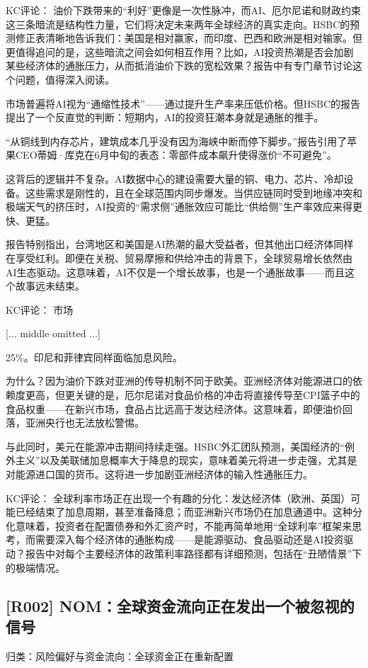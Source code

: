 \documentclass[11pt]{ctexart}
\begin{document}
KC评论： 油价下跌带来的“利好”更像是一次性脉冲，而AI、厄尔尼诺和财政约束这三条暗流是结构性力量，它们将决定未来两年全球经济的真实走向。HSBC的预测修正表清晰地告诉我们：美国是相对赢家，而印度、巴西和欧洲是相对输家。但更值得追问的是，这些暗流之间会如何相互作用？比如，AI投资热潮是否会加剧某些经济体的通胀压力，从而抵消油价下跌的宽松效果？报告中有专门章节讨论这个问题，值得深入阅读。

市场普遍将AI视为“通缩性技术”——通过提升生产率来压低价格。但HSBC的报告提出了一个反直觉的判断：短期内，AI的投资狂潮本身就是通胀的推手。

“从铜线到内存芯片，建筑成本几乎没有因为海峡中断而停下脚步。”报告引用了苹果CEO蒂姆·库克在6月中旬的表态：零部件成本飙升使得涨价“不可避免”。

这背后的逻辑并不复杂。AI数据中心的建设需要大量的铜、电力、芯片、冷却设备。这些需求是刚性的，且在全球范围内同步爆发。当供应链同时受到地缘冲突和极端天气的挤压时，AI投资的“需求侧”通胀效应可能比“供给侧”生产率效应来得更快、更猛。

报告特别指出，台湾地区和美国是AI热潮的最大受益者，但其他出口经济体同样在享受红利。即便在关税、贸易摩擦和供给冲击的背景下，全球贸易增长依然由AI生态驱动。这意味着，AI不仅是一个增长故事，也是一个通胀故事——而且这个故事远未结束。

KC评论： 市场

[... middle omitted ...]

25\%。印尼和菲律宾同样面临加息风险。

为什么？因为油价下跌对亚洲的传导机制不同于欧美。亚洲经济体对能源进口的依赖度更高，但更关键的是，厄尔尼诺对食品价格的冲击将直接传导至CPI篮子中的食品权重——在新兴市场，食品占比远高于发达经济体。这意味着，即便油价回落，亚洲央行也无法放松警惕。

与此同时，美元在能源冲击期间持续走强。HSBC外汇团队预测，美国经济的“例外主义”以及美联储加息概率大于降息的现实，意味着美元将进一步走强，尤其是对能源进口国的货币。这将进一步加剧亚洲经济体的输入性通胀压力。

KC评论： 全球利率市场正在出现一个有趣的分化：发达经济体（欧洲、英国）可能已经结束了加息周期，甚至准备降息；而亚洲新兴市场仍在加息通道中。这种分化意味着，投资者在配置债券和外汇资产时，不能再简单地用“全球利率”框架来思考，而需要深入每个经济体的通胀构成——是能源驱动、食品驱动还是AI投资驱动？报告中对每个主要经济体的政策利率路径都有详细预测，包括在“丑陋情景”下的极端情况。

\subsection{[R002] NOM：全球资金流向正在发出一个被忽视的信号}
{\small\color{refgray}归类：风险偏好与资金流向：全球资金正在重新配置}
\end{document}
